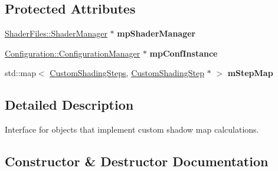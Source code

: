 \subsection*{Protected Attributes}
\begin{DoxyCompactItemize}
\item 
\mbox{\label{class_geometry_engine_1_1_custom_shading_1_1_custom_shading_interface_a5724c1310c865126c986b0ee0e862cd5}} 
\mbox{\hyperlink{class_shader_files_1_1_shader_manager}{Shader\+Files\+::\+Shader\+Manager}} $\ast$ {\bfseries mp\+Shader\+Manager}
\item 
\mbox{\label{class_geometry_engine_1_1_custom_shading_1_1_custom_shading_interface_a6fe0b6548231519a836658ff5e9adcd8}} 
\mbox{\hyperlink{class_configuration_1_1_configuration_manager}{Configuration\+::\+Configuration\+Manager}} $\ast$ {\bfseries mp\+Conf\+Instance}
\item 
\mbox{\label{class_geometry_engine_1_1_custom_shading_1_1_custom_shading_interface_a7ac880b1034789a03a164559c013c8a3}} 
std\+::map$<$ \mbox{\hyperlink{namespace_geometry_engine_1_1_custom_shading_a2dc236a5b567da5099069ce2b2be5609}{Custom\+Shading\+Steps}}, \mbox{\hyperlink{class_geometry_engine_1_1_custom_shading_1_1_custom_shading_step}{Custom\+Shading\+Step}} $\ast$ $>$ {\bfseries m\+Step\+Map}
\end{DoxyCompactItemize}


\subsection{Detailed Description}
Interface for objects that implement custom shadow map calculations. 

\subsection{Constructor \& Destructor Documentation}
\mbox{\label{class_geometry_engine_1_1_custom_shading_1_1_custom_shading_interface_ad1dcc337f5f6d31dc58e34ad5225629b}} 
